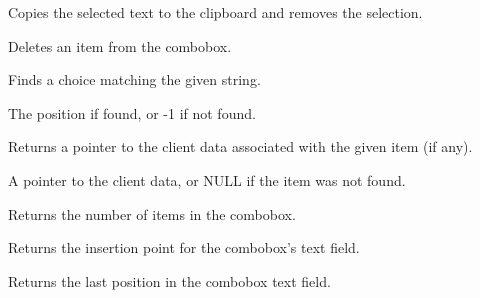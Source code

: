 
Copies the selected text to the clipboard and removes the selection.

\label{wxcomboboxdelete}


Deletes an item from the combobox.



\label{wxcomboboxfindstring}


Finds a choice matching the given string.




The position if found, or -1 if not found.

\label{wxcomboboxgetclientdata}


Returns a pointer to the client data associated with the given item (if any).




A pointer to the client data, or NULL if the item was not found.

\label{wxcomboboxgetcount}


Returns the number of items in the combobox.

\label{wxcomboboxgetinsertionpoint}


Returns the insertion point for the combobox's text field.

\label{wxcomboboxgetlastposition}


Returns the last position in the combobox text field.

